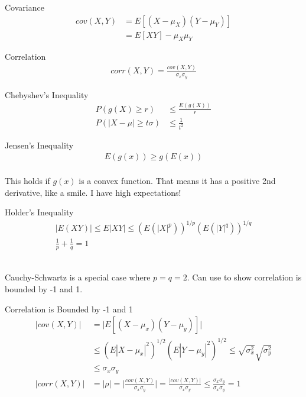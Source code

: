 \documentclass[avery5388,grid,frame]{flashcards}
\begin{document}
\begin{flashcard}[Definition]{Covariance}
\bigskip\bigskip\bigskip
{\begin{align*}
cov(X,Y)&=E[(X-\mu_X)(Y-\mu_Y)]\\
&=E[XY]-\mu_X\mu_Y
\end{align*}}
\end{flashcard}
\begin{flashcard}[Definition]{Correlation}
\bigskip\bigskip\bigskip
{\begin{align*}
corr(X,Y)=\frac{cov(X,Y)}{\sigma_x\sigma_y}
\end{align*}}
\end{flashcard}
\begin{flashcard}[Definition]{Chebyshev's Inequality}
\bigskip\bigskip\bigskip
{\begin{align*}
P(g(X)\geq r)&\leq \frac{E(g(X))}{r}\\
P(|X-\mu|\geq t\sigma)&\leq\frac{1}{t^2}
\end{align*}}
\end{flashcard}
\begin{flashcard}[Definition]{Jensen's Inequality}
\bigskip\bigskip\bigskip
{\begin{align*}
E(g(x))\geq g(E(x))
\end{align*}}
\bigskip\\
This holds if $g(x)$ is a convex function. That means it has a positive 2nd derivative, like a smile. I have high expectations!
\end{flashcard}
\begin{flashcard}[Definition]{Holder's Inequality}
\bigskip\bigskip\bigskip
{\begin{align*}
|E(XY)|\leq E|XY|\leq (E(|X|^p))^{1/p}(E(|Y|^q))^{1/q}\\
\frac{1}{p}+\frac{1}{q}=1
\end{align*}}
\bigskip\\
\begin{center}
Cauchy-Schwartz is a special case where $p=q=2$. Can use to show correlation is bounded by -1 and 1.
\end{center}
\end{flashcard}
\begin{flashcard}[Proof]{Correlation is Bounded by -1 and 1}
\bigskip\bigskip\bigskip
{\begin{align*}
\Big|cov(X,Y)\Big|&=\Big|E[(X-\mu_x)(Y-\mu_y)]\Big|\\
&\leq(E|X-\mu_x|^2)^{1/2}(E|Y-\mu_y|^2)^{1/2}\leq\sqrt{\sigma_x^2}\sqrt{\sigma_y^2}\\
&\leq\sigma_x\sigma_y\\
\Big|corr(X,Y)\Big|&=\Big|\rho\Big|=\Big|\frac{cov(X,Y)}{\sigma_x\sigma_y}\Big|=\frac{\Big|cov(X,Y)\Big|}{\sigma_x\sigma_y}\leq\frac{\sigma_x\sigma_y}{\sigma_x\sigma_y}=1
\end{align*}}
\end{flashcard}
\end{document}
